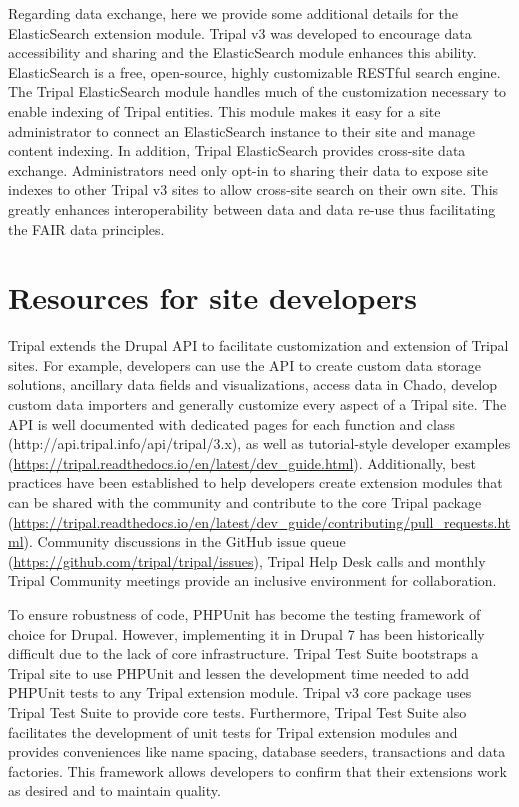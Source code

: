 Regarding data exchange, here we provide some additional details for the ElasticSearch extension module. Tripal v3 was developed to encourage data accessibility and sharing and the ElasticSearch module enhances this ability. ElasticSearch \cite{gormley2015elasticsearch} is a free, open-source, highly customizable RESTful search engine. The Tripal ElasticSearch module \cite{chen2017new} handles much of the customization necessary to enable indexing of Tripal entities. This module makes it easy for a site administrator to connect an ElasticSearch instance to their site and manage content indexing. In addition, Tripal ElasticSearch provides cross-site data exchange. Administrators need only opt-in to sharing their data to expose site indexes to other Tripal v3 sites to allow cross-site search on their own site. This greatly enhances interoperability between data and data re-use thus facilitating the FAIR data principles.


\section*{Resources for site developers}

Tripal extends the Drupal API to facilitate customization and extension of Tripal sites. For example, developers can use the API to create custom data storage solutions, ancillary data fields and visualizations, access data in Chado, develop custom data importers and generally customize every aspect of a Tripal site. The API is well documented with dedicated pages for each function and class (http://api.tripal.info/api/tripal/3.x), as well as tutorial-style developer examples (\url{https://tripal.readthedocs.io/en/latest/dev_guide.html}). Additionally, best practices have been established to help developers create extension modules that can be shared with the community and contribute to the core Tripal package (\url{https://tripal.readthedocs.io/en/latest/dev_guide/contributing/pull_requests.html}). Community discussions in the GitHub issue queue (\url{https://github.com/tripal/tripal/issues}), Tripal Help Desk calls and monthly Tripal Community meetings provide an inclusive environment for collaboration.

To ensure robustness of code, PHPUnit has become the testing framework of choice for Drupal. However, implementing it in Drupal 7 has been historically difficult due to the lack of core infrastructure. Tripal Test Suite \cite{condon2018tripal} bootstraps a Tripal site to use PHPUnit and lessen the development time needed to add PHPUnit tests to any Tripal extension module. Tripal v3 core package uses Tripal Test Suite to provide core tests. Furthermore, Tripal Test Suite also facilitates the development of unit tests for Tripal extension modules and provides conveniences like name spacing, database seeders, transactions and data factories. This framework allows developers to confirm that their extensions work as desired and to maintain quality.

